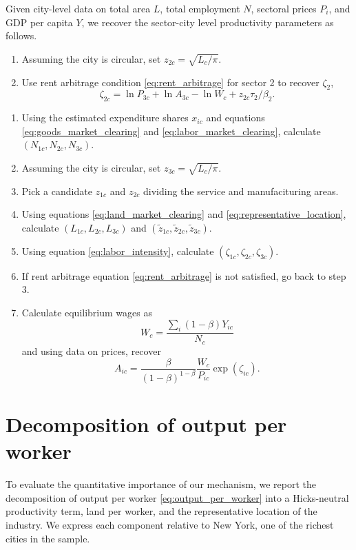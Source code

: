 \documentclass[12pt]{article}
\begin{document}
Given city-level data on total area $L$, total employment $N$, sectoral prices $P_i$, and GDP per capita $Y$, we recover the sector-city level productivity parameters as follows.

\begin{enumerate}
	\item Assuming the city is circular, set $z_{2c}=\sqrt{L_c/\pi}$.
	\item Use rent arbitrage condition \eqref{eq:rent_arbitrage} for sector 2 to recover $\zeta_2$,
	\[
	\zeta_{2c} = \ln P_{3c} + \ln A_{3c} - \ln W_c + z_{2c}\tau_2/\beta_2.
	\]
\end{enumerate}
\begin{enumerate}
	\item Using the estimated expenditure shares $x_{ic}$ and equations \eqref{eq:goods_market_clearing} and \eqref{eq:labor_market_clearing}, calculate $(N_{1c},N_{2c},N_{3c})$.
	\item Assuming the city is circular, set $z_{3c}=\sqrt{L_c/\pi}$.
	\item Pick a candidate $z_{1c}$ and $z_{2c}$ dividing the service and manufacituring areas.
	\item Using equations \eqref{eq:land_market_clearing} and \eqref{eq:representative_location}, calculate $(L_{1c}, L_{2c}, L_{3c})$ and $(\tilde z_{1c}, \tilde z_{2c}, \tilde z_{3c})$.
	\item Using equation \eqref{eq:labor_intensity}, calculate $(\zeta_{1c}, \zeta_{2c}, \zeta_{3c})$.
	\item If rent arbitrage equation \eqref{eq:rent_arbitrage} is not satisfied, go back to step 3.
	\item Calculate equilibrium wages as
	\[
		W_c = \frac
			{\sum_i (1-\beta)Y_{ic}}
			{N_c}
	\]
	and using data on prices, recover
	\[
		A_{ic} =
			 \frac {\beta}{(1-\beta)^{1-\beta}}
			 \frac {W_c}{P_{ic}}
			 \exp(\zeta_{ic}).
	\]
\end{enumerate}

\section{Decomposition of output per worker}
To evaluate the quantitative importance of our mechanism, we report the decomposition of output per worker \eqref{eq:output_per_worker} into a Hicks-neutral productivity term, land per worker, and the representative location of the industry. We express each component relative to New York, one of the richest cities in the sample.
\end{document}
